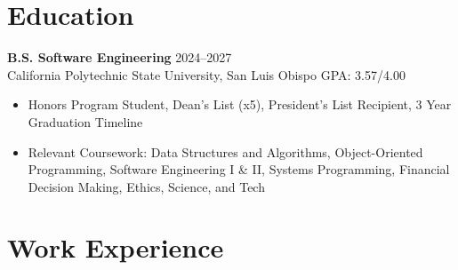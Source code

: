 \documentclass[letterpaper, 11pt]{article}
\makeatletter
\newenvironment{joblong}[2]
    {
    \begin{tabularx}{\linewidth}{@{}l X r@{}}
    \textbf{#1} & \hfill &  #2 \\[3.75pt]
    \end{tabularx}
    \begin{minipage}[t]{\linewidth}
    \begin{itemize}[nosep,after=\strut, leftmargin=1em, itemsep=3pt,label=\small$\bullet$]
    }
    {
    \end{itemize}
    \end{minipage}    
    }
\makeatother
\begin{document}
\section{Education}
\textbf{B.S. Software Engineering} \hfill 2024--2027 \\
California Polytechnic State University, San Luis Obispo \hfill GPA: 3.57/4.00 
\begin{itemize}[leftmargin=15pt, nosep, label=\small$\bullet$]
    \item Honors Program Student, Dean's List (x5), President's List Recipient, 3 Year Graduation Timeline
    \item Relevant Coursework: Data Structures and Algorithms, Object-Oriented Programming, Software Engineering I \& II, Systems Programming, Financial Decision Making, Ethics, Science, and Tech
\end{itemize}


\section{Work Experience}

\end{document}
